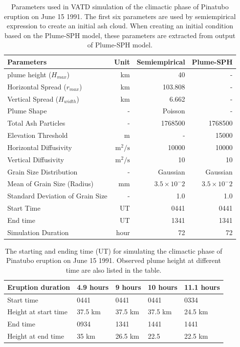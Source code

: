 \documentclass[utf8]{frontiersSCNS} %
\begin{document}
\begin{table}[htp]
\centering
\caption{Parameters used in VATD simulation of the climactic phase of Pinatubo eruption on June 15 1991. The first six parameters are used by semiempirical expression to create an initial ash cloud. When creating an initial condition based on the Plume-SPH model, these parameters are extracted from output of Plume-SPH model.}
	 \begin{tabular}{lrrr}
	 \hline
	 Parameters & Unit & Semiempirical & Plume-SPH \\
	 \hline
	 plume height ($H_{max}$) & km & 40 & - \\ %
	 Horizontal Spread ($r_{max}$) & km & 103.808 & -\\
	 Vertical Spread ($H_{width}$) & km & 6.662 & - \\
	 Plume Shape & - & Poisson & - \\
	 Total Ash Particles & - & 1768500 & 1768500 \\
	 Elevation Threshold & m & - & 15000 \\
	 Horizontal Diffusivity & $\mathrm{m}^2/\mathrm{s}$ &10000 & 10000\\
	 Vertical Diffusivity & $\mathrm{m}^2/\mathrm{s}$ & 10 & 10 \\
	 Grain Size Distribution & - & Gaussian & Gaussian \\
	 Mean of Grain Size (Radius) & mm & $3.5 \times 10 ^-2$ & $3.5 \times 10 ^-2$ \\
	 Standard Deviation of Grain Size & - & 1.0 & 1.0 \\
	 	Start Time & UT & 0441 & 0441 \\
	 End time & UT & 1341 & 1341 \\
	 Simulation Duration & hour & 72 & 72 \\
	 \hline
	 \end{tabular}
	 \label{tab:input_parameter_Puff_simulation}
\end{table}

\begin{table}[htp]
\centering
\caption{The starting and ending time (UT) for simulating the climactic phase of Pinatubo eruption on June 15 1991. Observed plume height \citep{holasek1996satellite} at different time are also listed in the table.}		
	 \begin{tabular}{p{35mm}p{20mm}p{20mm}p{20mm}p{20mm}}
	 \hline
Eruption duration & 4.9 hours & 9 hours & 10 hours & 11.1 hours \\
	 \hline
	 Start time & 0441 & 0441 & 0441 & 0334 \\
	 Height at start time & 37.5 km & 37.5 km & 37.5 km & 24.5 km \\
	
	 End time & 0934 & 1341 & 1441 & 1441 \\
	 	Height at end time & 35 km & 26.5 km & 22.5 & 22.5 km \\
	 \hline
	 \end{tabular}
	 \label{tab:Pinatubo-eruption-duration}
\end{table}
\end{document}
